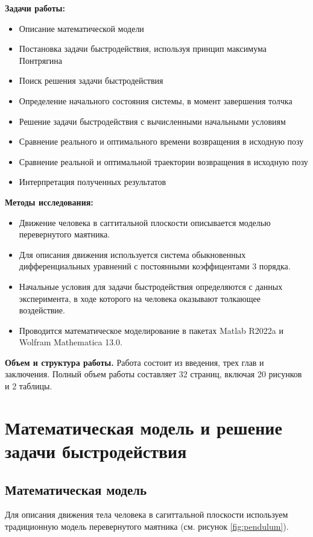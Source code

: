\documentclass[a4paper,12pt, openany]{book}
\theoremstyle{plain} %
\theoremstyle{definition} %
\theoremstyle{remark} %
\numberwithin{equation}{chapter}
\begin{document}
{\textbf{Задачи работы: }
\begin{itemize}
    \item Описание математической модели
    \item Постановка задачи быстродействия, используя принцип максимума Понтрягина
    \item Поиск решения задачи быстродействия
    \item Определение начального состояния системы, в момент завершения толчка
    \item Решение задачи быстродействия с вычисленными начальными условиям
    \item Сравнение реального и оптимального времени возвращения в исходную позу
    \item Сравнение реальной и оптимальной траектории возвращения в исходную позу
    \item Интерпретация полученных результатов
\end{itemize}

\textbf{Методы исследования:}
\begin{itemize}
    \item Движение человека в саггитальной плоскости описывается моделью перевернутого маятника.
    \item Для описания движения используется система обыкновенных дифференциальных уравнений с постоянными коэффицентами 3 порядка.
    \item Начальные условия для задачи быстродействия определяются с данных эксперимента, в ходе которого на человека оказывают толкающее воздействие.
    \item Проводится математическое моделирование в пакетах Matlab R2022a и Wolfram Mathematica 13.0.
\end{itemize}




\textbf{Объем и структура работы.} Работа состоит из введения, трех глав и заключения. Полный объем работы составляет
32 страниц, включая 20 рисунков и 2 таблицы.

\newpage

\chapter{Математическая модель и решение задачи быстродействия}
\section{Математическая модель}
Для описания движения тела человека в сагиттальной плоскости используем традиционную модель перевернутого маятника (см. рисунок \ref{fig:pendulum}).

}
\end{document}
